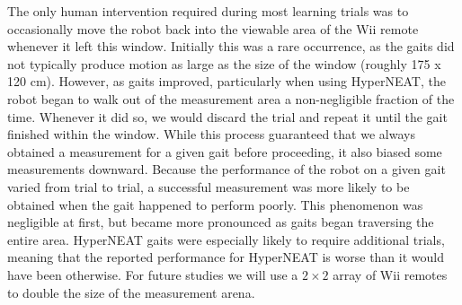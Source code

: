 
The only human intervention required during most learning trials was
to occasionally move the robot back into the viewable area of the Wii
remote whenever it left this window.  Initially this was a rare
occurrence, as the gaits did not typically produce motion as large as
the size of the window (roughly 175 x 120 cm).  However, as gaits
improved, particularly when using HyperNEAT, the robot began to walk
out of the measurement area a non-negligible fraction of the time.
Whenever it did so, we would discard the trial and repeat it until the
gait finished within the window. While this process guaranteed that we always obtained a measurement
for a given gait before proceeding, it also biased some measurements
downward.  Because the performance of the robot on a given gait varied
from trial to trial, a successful measurement was more likely to be
obtained when the gait happened to perform poorly.  This phenomenon
was negligible at first, but became more pronounced as gaits began traversing the entire
area.  HyperNEAT gaits were especially likely to require additional trials, meaning that the reported performance for HyperNEAT is worse than it would have been otherwise. For future studies we will use a $2\times2$ array of Wii
remotes to double the size of the measurement arena.
